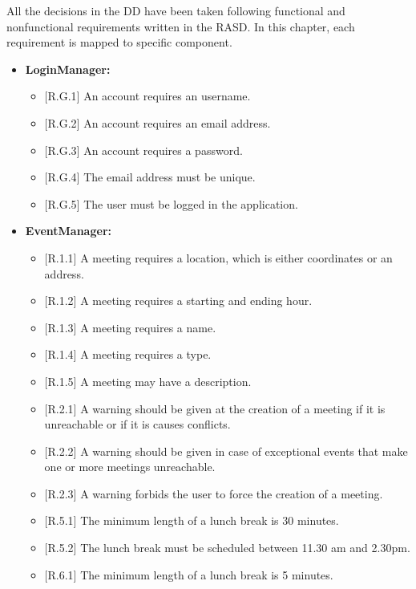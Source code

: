 All the decisions in the DD have been taken following functional and nonfunctional requirements written in the RASD. In this chapter, each requirement is mapped to specific component.
\\
\begin{itemize}

\item
\textbf{LoginManager:}
\begin{itemize}
\item
$[$R.G.1$]$ An account requires an username.
\item
$[$R.G.2$]$ An account requires an email address.
\item 
$[$R.G.3$]$ An account requires a password.
\item
$[$R.G.4$]$ The email address must be unique.
\item
$[$R.G.5$]$ The user must be logged in the application.
\end{itemize}

\item
\textbf{EventManager:}
\begin{itemize}
\item
$[$R.1.1$]$ A meeting requires a location, which is either coordinates or an address.
\item
$[$R.1.2$]$ A meeting requires a starting and ending hour.
\item
$[$R.1.3$]$ A meeting requires a name.
\item
$[$R.1.4$]$ A meeting requires a type.
\item
$[$R.1.5$]$ A meeting may have a description.
\item
$[$R.2.1$]$ A warning should be given at the creation of a meeting if it is unreachable or if
it is causes conflicts.
\item
$[$R.2.2$]$ A warning should be given in case of exceptional events that make one or more
meetings unreachable.
\item
$[$R.2.3$]$ A warning forbids the user to force the creation of a meeting.
\item
$[$R.5.1$]$ The minimum length of a lunch break is 30 minutes.
\item
$[$R.5.2$]$ The lunch break must be scheduled between 11.30 am and 2.30pm.
\item
$[$R.6.1$]$ The minimum length of a lunch break is 5 minutes.
\end{itemize}


\end{itemize}
